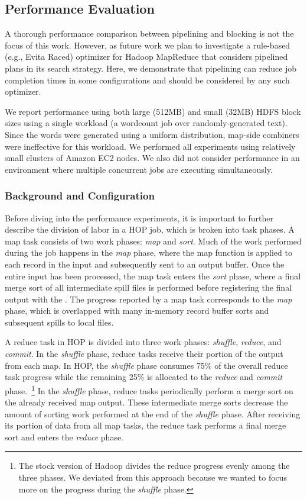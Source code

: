 \subsection{Performance Evaluation}
\label{ch:hop:sec:perf}

A thorough performance comparison between pipelining and blocking is not the
focus of this work.  However, as future work we plan to investigate a
rule-based (e.g., Evita Raced) optimizer for Hadoop MapReduce that considers
pipelined plans in its search strategy.  Here, we demonstrate that pipelining
can reduce job completion times in some configurations and should be considered
by any such optimizer.

We report performance using both large (512MB) and small (32MB) HDFS block
sizes using a single workload (a wordcount job over randomly-generated text).
Since the words were generated using a uniform distribution, map-side combiners
were ineffective for this workload.  We performed all experiments using
relatively small clusters of Amazon EC2 nodes.  We also did not consider
performance in an environment where multiple concurrent jobs are executing
simultaneously.

\subsubsection{Background and Configuration}

Before diving into the performance experiments, it is important to further
describe the division of labor in a HOP job, which is broken into task phases.
A map task consists of two work phases: {\em map} and {\em sort}.  Much of the
work performed during the job happens in the {\em map} phase, where the map
function is applied to each record in the input and subsequently sent to an
output buffer.  Once the entire input has been processed, the map task enters
the {\em sort} phase, where a final merge sort of all intermediate spill files
is performed before registering the final output with the \TT.  The progress
reported by a map task corresponds to the {\em map} phase, which is overlapped
with many in-memory record buffer sorts and subsequent spills to local files.

A reduce task in HOP is divided into three work phases: {\em shuffle}, {\em
reduce}, and {\em commit}.  In the {\em shuffle} phase, reduce tasks receive
their portion of the output from each map.  In HOP, the {\em shuffle} phase
consumes 75\% of the overall reduce task progress while the remaining 25\% is
allocated to the {\em reduce} and {\em commit} phase.~\footnote{The stock
version of Hadoop divides the reduce progress evenly among the three phases.
We deviated from this approach because we wanted to focus more on the progress
during the {\em shuffle} phase.} In the {\em shuffle} phase, reduce tasks
periodically perform a merge sort on the already received map output.  These
intermediate merge sorts decrease the amount of sorting work performed at the
end of the {\em shuffle} phase.  After receiving its portion of data from all
map tasks, the reduce task performs a final merge sort and enters the {\em
reduce} phase.

